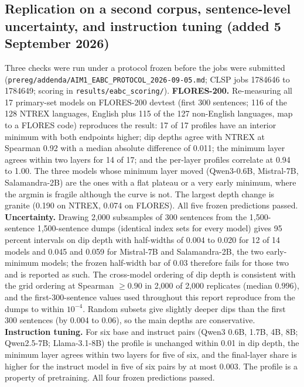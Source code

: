 \documentclass[11pt,a4paper]{article}
\begin{document}
\subsection{Replication on a second corpus, sentence-level uncertainty, and instruction tuning (added 5 September 2026)}
\label{sec:replication}
Three checks were run under a protocol frozen before the jobs were submitted
(\texttt{prereg/addenda/AIM1\_EABC\_PROTOCOL\_2026-09-05.md}; CLSP jobs
1784646 to 1784649; scoring in \texttt{results/eabc\_scoring/}).
\textbf{FLORES-200.} Re-measuring all 17 primary-set models on FLORES-200
devtest (first 300 sentences; 116 of the 128 NTREX languages, English plus
115 of the 127 non-English languages, map to a FLORES code) reproduces the result: 17 of 17 profiles have an interior minimum
with both endpoints higher; dip depths agree with NTREX at Spearman 0.92 with a
median absolute difference of 0.011; the minimum layer agrees within two
layers for 14 of 17; and the per-layer profiles correlate at 0.94 to 1.00. The
three models whose minimum layer moved (Qwen3-0.6B, Mistral-7B, Salamandra-2B)
are the ones with a flat plateau or a very early minimum, where the argmin is
fragile although the curve is not. The largest depth change is granite
(0.190 on NTREX, 0.074 on FLORES). All five frozen predictions passed.
\textbf{Uncertainty.} Drawing 2,000 subsamples of 300 sentences from the
1,500-sentence 1,500-sentence dumps (identical index sets for every model) gives
95 percent intervals on dip depth with half-widths of 0.004 to 0.020 for 12 of
14 models and 0.045 and 0.059 for Mistral-7B and Salamandra-2B, the two
early-minimum models; the frozen half-width bar of 0.03 therefore fails for
those two and is reported as such. The cross-model ordering of dip depth is
consistent with the grid ordering at Spearman $\geq 0.90$ in 2,000 of 2,000 replicates (median $0.996$), and the first-300-sentence values used
throughout this report reproduce from the dumps to within $10^{-4}$. Random
subsets give slightly deeper dips than the first 300 sentences (by 0.004 to
0.06), so the main depths are conservative.
\textbf{Instruction tuning.} For six base and instruct pairs (Qwen3 0.6B,
1.7B, 4B, 8B; Qwen2.5-7B; Llama-3.1-8B) the profile is unchanged within 0.01
in dip depth, the minimum layer agrees within two layers for five of six, and
the final-layer share is higher for the instruct model in five of six pairs by
at most 0.003. The profile is a property of pretraining. All four frozen
predictions passed.
\end{document}
